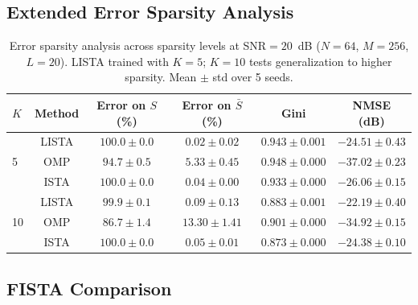 \documentclass[a4paper,fleqn]{cas-sc}
\begin{document}

\subsection{Extended Error Sparsity Analysis}\label{sec:supp_sparsity_extended}

\begin{table}[width=.9\linewidth,cols=6,pos=!htbp]
\caption{Error sparsity analysis across sparsity levels at SNR$=20$~dB ($N=64$, $M=256$, $L=20$). LISTA trained with $K=5$; $K=10$ tests generalization to higher sparsity. Mean $\pm$ std over 5 seeds.}\label{tab:error_sparsity_extended}
\begin{tabular*}{\tblwidth}{@{} LCCCCC@{}}
\toprule
$K$ & Method & Error on $S$ (\%) & Error on $\bar{S}$ (\%) & Gini & NMSE (dB) \\
\midrule
{}
  & LISTA & $\bm{100.0} \pm 0.0$ & $\bm{0.02} \pm 0.02$ & $0.943 \pm 0.001$ & $-24.51 \pm 0.43$ \\
  & OMP   & $94.7 \pm 0.5$ & $5.33 \pm 0.45$ & $0.948 \pm 0.000$ & $-37.02 \pm 0.23$ \\
  & ISTA  & $100.0 \pm 0.0$ & $0.04 \pm 0.00$ & $0.933 \pm 0.000$ & $-26.06 \pm 0.15$ \\
\midrule
{}
  & LISTA & $\bm{99.9} \pm 0.1$ & $\bm{0.09} \pm 0.13$ & $0.883 \pm 0.001$ & $-22.19 \pm 0.40$ \\
  & OMP   & $86.7 \pm 1.4$ & $13.30 \pm 1.41$ & $0.901 \pm 0.000$ & $-34.92 \pm 0.15$ \\
  & ISTA  & $100.0 \pm 0.0$ & $0.05 \pm 0.01$ & $0.873 \pm 0.000$ & $-24.38 \pm 0.10$ \\
\bottomrule
\end{tabular*}
\end{table}



\subsection{FISTA Comparison}\label{sec:supp_fista}
\end{document}
